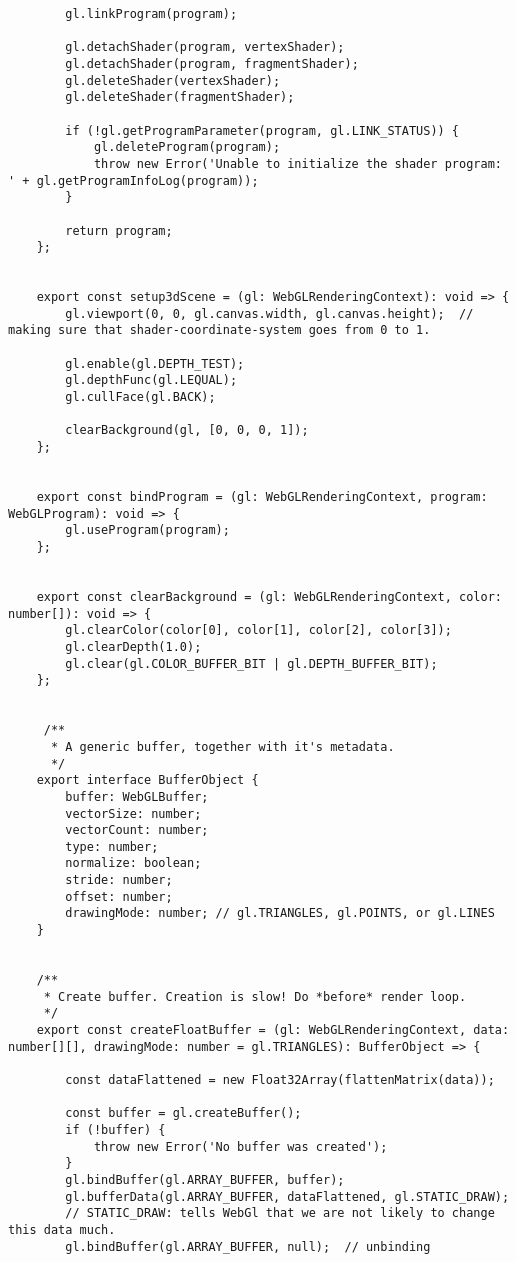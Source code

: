 {\begin{lstlisting}
        gl.linkProgram(program);
    
        gl.detachShader(program, vertexShader);
        gl.detachShader(program, fragmentShader);
        gl.deleteShader(vertexShader);
        gl.deleteShader(fragmentShader);
    
        if (!gl.getProgramParameter(program, gl.LINK_STATUS)) {
            gl.deleteProgram(program);
            throw new Error('Unable to initialize the shader program: ' + gl.getProgramInfoLog(program));
        }
    
        return program;
    };
    
    
    export const setup3dScene = (gl: WebGLRenderingContext): void => {
        gl.viewport(0, 0, gl.canvas.width, gl.canvas.height);  // making sure that shader-coordinate-system goes from 0 to 1.
    
        gl.enable(gl.DEPTH_TEST);
        gl.depthFunc(gl.LEQUAL);
        gl.cullFace(gl.BACK);
    
        clearBackground(gl, [0, 0, 0, 1]);
    };
    
    
    export const bindProgram = (gl: WebGLRenderingContext, program: WebGLProgram): void => {
        gl.useProgram(program);
    };
    
    
    export const clearBackground = (gl: WebGLRenderingContext, color: number[]): void => {
        gl.clearColor(color[0], color[1], color[2], color[3]);
        gl.clearDepth(1.0);
        gl.clear(gl.COLOR_BUFFER_BIT | gl.DEPTH_BUFFER_BIT);
    };
    
    
     /**
      * A generic buffer, together with it's metadata.
      */
    export interface BufferObject {
        buffer: WebGLBuffer;
        vectorSize: number;
        vectorCount: number;
        type: number;
        normalize: boolean;
        stride: number;
        offset: number;
        drawingMode: number; // gl.TRIANGLES, gl.POINTS, or gl.LINES
    }
    
    
    /**
     * Create buffer. Creation is slow! Do *before* render loop.
     */
    export const createFloatBuffer = (gl: WebGLRenderingContext, data: number[][], drawingMode: number = gl.TRIANGLES): BufferObject => {
    
        const dataFlattened = new Float32Array(flattenMatrix(data));
    
        const buffer = gl.createBuffer();
        if (!buffer) {
            throw new Error('No buffer was created');
        }
        gl.bindBuffer(gl.ARRAY_BUFFER, buffer);
        gl.bufferData(gl.ARRAY_BUFFER, dataFlattened, gl.STATIC_DRAW);
        // STATIC_DRAW: tells WebGl that we are not likely to change this data much.
        gl.bindBuffer(gl.ARRAY_BUFFER, null);  // unbinding
    

\end{lstlisting}}
